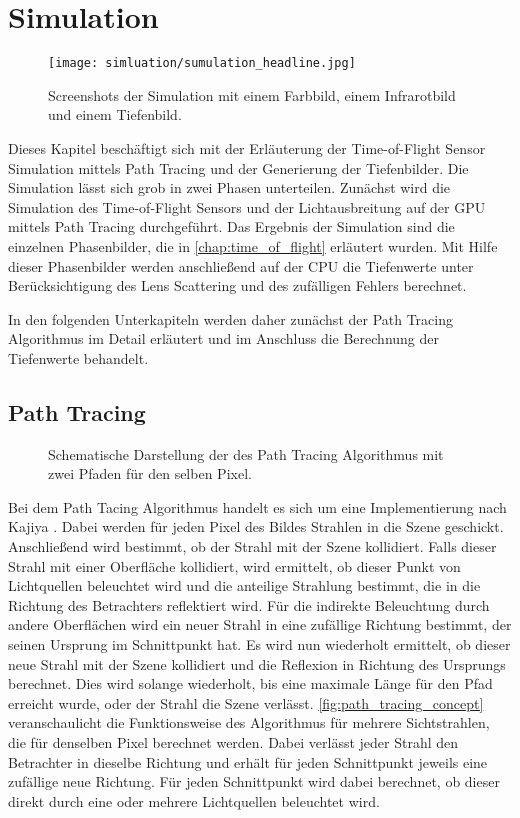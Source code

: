 \documentclass[thesis.tex]{subfiles}
\begin{document}
\chapter{Simulation}\label{chap:simulation}
%
\begin{figure}[ht!]
\centering
\texttt{[image: simluation/sumulation\_headline.jpg]}
\caption{Screenshots der Simulation mit einem Farbbild, einem Infrarotbild und einem Tiefenbild.}
\label{fig:simulation_headline_image}
\end{figure}
Dieses Kapitel beschäftigt sich mit der Erläuterung der Time-of-Flight Sensor Simulation mittels Path Tracing und der Generierung der Tiefenbilder. Die Simulation lässt sich grob in zwei Phasen unterteilen. Zunächst wird die Simulation des Time-of-Flight Sensors und der Lichtausbreitung auf der GPU mittels Path Tracing durchgeführt. Das Ergebnis der Simulation sind die einzelnen Phasenbilder, die in \autoref{chap:time_of_flight} erläutert wurden. Mit Hilfe dieser Phasenbilder werden anschließend auf der CPU die Tiefenwerte unter Berücksichtigung des Lens Scattering und des zufälligen Fehlers berechnet.

In den folgenden Unterkapiteln werden daher zunächst der Path Tracing Algorithmus im Detail erläutert und im Anschluss die Berechnung der Tiefenwerte behandelt.
%
\section{Path Tracing}

\begin{figure}[ht!]
    \centering
    \caption{Schematische Darstellung der des Path Tracing Algorithmus mit zwei Pfaden für den selben Pixel.}
    \label{fig:path_tracing_concept}
\end{figure}

Bei dem Path Tacing Algorithmus handelt es sich um eine Implementierung nach Kajiya \cite{bib:Kajiya1986}. Dabei werden für jeden Pixel des Bildes Strahlen in die Szene geschickt. Anschließend wird bestimmt, ob der Strahl mit der Szene kollidiert. Falls dieser Strahl mit einer Oberfläche kollidiert, wird ermittelt, ob dieser Punkt von Lichtquellen beleuchtet wird und die anteilige Strahlung bestimmt, die in die Richtung des Betrachters reflektiert wird. Für die indirekte Beleuchtung durch andere Oberflächen wird ein neuer Strahl in eine zufällige Richtung bestimmt, der seinen Ursprung im Schnittpunkt hat. Es wird nun wiederholt ermittelt, ob dieser neue Strahl mit der Szene kollidiert und die Reflexion in Richtung des Ursprungs berechnet. Dies wird solange wiederholt, bis eine maximale Länge für den Pfad erreicht wurde, oder der Strahl die Szene verlässt. \autoref{fig:path_tracing_concept} veranschaulicht die Funktionsweise des Algorithmus für mehrere Sichtstrahlen, die für denselben Pixel berechnet werden. Dabei verlässt jeder Strahl den Betrachter in dieselbe Richtung und erhält für jeden Schnittpunkt jeweils eine zufällige neue Richtung. Für jeden Schnittpunkt wird dabei berechnet, ob dieser direkt durch eine oder mehrere Lichtquellen beleuchtet wird.
\end{document}
